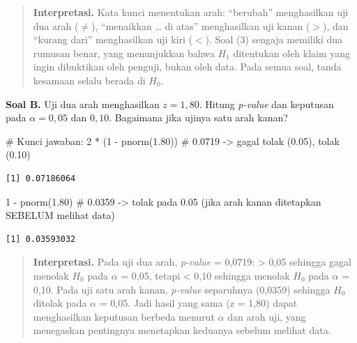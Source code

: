 \documentclass[
  indonesian,
  letterpaper,
]{book}
\newenvironment{Shaded}{\begin{snugshade}}{\end{snugshade}}
\newcommand{\CommentTok}[1]{\textcolor[rgb]{0.37,0.37,0.37}{#1}}
\newcommand{\DecValTok}[1]{\textcolor[rgb]{0.68,0.00,0.00}{#1}}
\newcommand{\FloatTok}[1]{\textcolor[rgb]{0.68,0.00,0.00}{#1}}
\newcommand{\FunctionTok}[1]{\textcolor[rgb]{0.28,0.35,0.67}{#1}}
\newcommand{\NormalTok}[1]{\textcolor[rgb]{0.00,0.23,0.31}{#1}}
\newcommand{\SpecialCharTok}[1]{\textcolor[rgb]{0.37,0.37,0.37}{#1}}
\begin{document}
\begin{quote}
\textbf{Interpretasi.} Kata kunci menentukan arah: ``berubah''
menghasilkan uji dua arah (\(\ne\)), ``menaikkan \ldots{} di atas''
menghasilkan uji kanan (\(>\)), dan ``kurang dari'' menghasilkan uji
kiri (\(<\)). Soal (3) sengaja memiliki dua rumusan benar, yang
menunjukkan bahwa \(H_1\) ditentukan oleh klaim yang ingin dibuktikan
oleh penguji, bukan oleh data. Pada semua soal, tanda kesamaan selalu
berada di \(H_0\).
\end{quote}

\textbf{Soal B.} Uji dua arah menghasilkan \(z = 1{,}80\). Hitung
\emph{p-value} dan keputusan pada \(\alpha = 0{,}05\) dan \(0{,}10\).
Bagaimana jika ujinya satu arah kanan?

\begin{Shaded}
\begin{Highlighting}[]
\CommentTok{\# Kunci jawaban:}
\DecValTok{2} \SpecialCharTok{*}\NormalTok{ (}\DecValTok{1} \SpecialCharTok{{-}} \FunctionTok{pnorm}\NormalTok{(}\FloatTok{1.80}\NormalTok{))   }\CommentTok{\# 0.0719 {-}\textgreater{} gagal tolak (0.05), tolak (0.10)}
\end{Highlighting}
\end{Shaded}

\begin{verbatim}
[1] 0.07186064
\end{verbatim}

\begin{Shaded}
\begin{Highlighting}[]
\DecValTok{1} \SpecialCharTok{{-}} \FunctionTok{pnorm}\NormalTok{(}\FloatTok{1.80}\NormalTok{)         }\CommentTok{\# 0.0359 {-}\textgreater{} tolak pada 0.05 (jika arah kanan ditetapkan SEBELUM melihat data)}
\end{Highlighting}
\end{Shaded}

\begin{verbatim}
[1] 0.03593032
\end{verbatim}

\begin{quote}
\textbf{Interpretasi.} Pada uji dua arah, \emph{p-value} = 0,0719:
\textgreater{} 0,05 sehingga gagal menolak \(H_0\) pada \(\alpha\) =
0,05, tetapi \textless{} 0,10 sehingga menolak \(H_0\) pada \(\alpha\) =
0,10. Pada uji satu arah kanan, \emph{p-value} separuhnya (0,0359)
sehingga \(H_0\) ditolak pada \(\alpha\) = 0,05. Jadi hasil yang sama (z
= 1,80) dapat menghasilkan keputusan berbeda menurut \(\alpha\) dan arah
uji, yang menegaskan pentingnya menetapkan keduanya sebelum melihat
data.
\end{quote}
\end{document}
